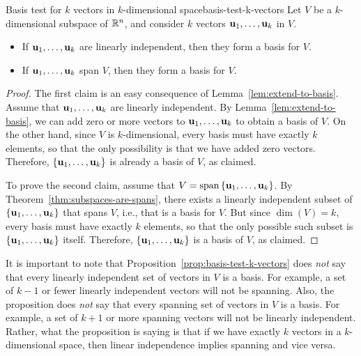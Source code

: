 \begin{proposition}{Basis test for $k$ vectors in $k$-dimensional space}{basis-test-k-vectors}
  Let $V$ be a $k$-dimensional subspace of $\mathbb{R}^n$, and consider $k$
  vectors $\vect{u}_{1},\ldots,\vect{u}_{k}$ in $V$.
  \begin{itemize}
  \item If $\vect{u}_{1},\ldots,\vect{u}_{k}$ are linearly
    independent, then they form a basis for $V$.
  \item If $\vect{u}_{1},\ldots,\vect{u}_{k}$ span $V$, then they
    form a basis for $V$.
  \end{itemize}
\end{proposition}

\begin{proof}
  The first claim is an easy consequence of
  Lemma~\ref{lem:extend-to-basis}. Assume that
  $\vect{u}_{1},\ldots,\vect{u}_{k}$ are linearly independent. By
  Lemma~\ref{lem:extend-to-basis}, we can add zero or more vectors to
  $\vect{u}_{1},\ldots,\vect{u}_{k}$ to obtain a basis of $V$. On the
  other hand, since $V$ is $k$-dimensional, every basis must have
  exactly $k$ elements, so that the only possibility is that we have
  added zero vectors. Therefore,
  $\set{\vect{u}_{1},\ldots,\vect{u}_{k}}$ is already a basis of $V$,
  as claimed.

  To prove the second claim, assume that
  $V=\sspan\set{\vect{u}_{1},\ldots,\vect{u}_{k}}$. By
  Theorem~\ref{thm:subspaces-are-spans}, there exists a linearly
  independent subset of $\set{\vect{u}_{1},\ldots,\vect{u}_{k}}$ that
  spans $V$, i.e., that is a basis for $V$. But since $\dim(V)=k$,
  every basis must have exactly $k$ elements, so that the only
  possible such subset is $\set{\vect{u}_{1},\ldots,\vect{u}_{k}}$
  itself. Therefore, $\set{\vect{u}_{1},\ldots,\vect{u}_{k}}$ is a
  basis of $V$, as claimed.
\end{proof}

It is important to note that
Proposition~\ref{prop:basis-test-k-vectors} does {\em not} say that
every linearly independent set of vectors in $V$ is a basis. For
example, a set of $k-1$ or fewer linearly independent vectors will not
be spanning. Also, the proposition does {\em not} say that every
spanning set of vectors in $V$ is a basis. For example, a set of $k+1$
or more spanning vectors will not be linearly independent. Rather,
what the proposition is saying is that if we have exactly $k$ vectors
in a $k$-dimensional space, then linear independence implies spanning
and vice versa.

